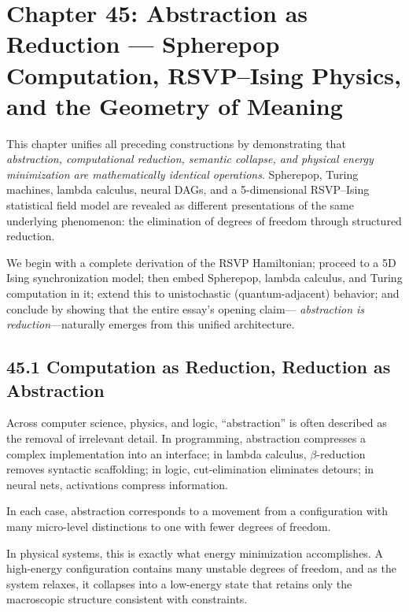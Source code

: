 \documentclass[12pt,letterpaper]{article}
\theoremstyle{remark}
\begin{document}
\newpage

\section{Chapter 45: Abstraction as Reduction —  
Spherepop Computation, RSVP–Ising Physics, and the Geometry of Meaning}

This chapter unifies all preceding constructions by demonstrating that 
\emph{abstraction, computational reduction, semantic collapse, 
and physical energy minimization are mathematically identical operations}.  
Spherepop, Turing machines, lambda calculus, neural DAGs, and 
a 5-dimensional RSVP–Ising statistical field model 
are revealed as different presentations of the same underlying phenomenon:
the elimination of degrees of freedom through structured reduction.

We begin with a complete derivation of the RSVP Hamiltonian; proceed to 
a 5D Ising synchronization model; then embed 
Spherepop, lambda calculus, and Turing computation in it; 
extend this to unistochastic (quantum-adjacent) behavior; 
and conclude by showing that the entire essay's opening claim—
\emph{abstraction is reduction}—naturally emerges from this unified architecture.

\subsection{45.1 Computation as Reduction, Reduction as Abstraction}

Across computer science, physics, and logic, ``abstraction'' is often described as 
the removal of irrelevant detail. In programming, abstraction compresses a complex implementation
into an interface; in lambda calculus, $\beta$-reduction removes syntactic scaffolding; 
in logic, cut-elimination eliminates detours; in neural nets, activations compress information.  

In each case, abstraction corresponds to a movement from a configuration 
with many micro-level distinctions to one with fewer degrees of freedom.

In physical systems, this is exactly what energy minimization accomplishes.
A high-energy configuration contains many unstable degrees of freedom,
and as the system relaxes, it collapses into a low-energy state that retains only the 
macroscopic structure consistent with constraints.
\end{document}
